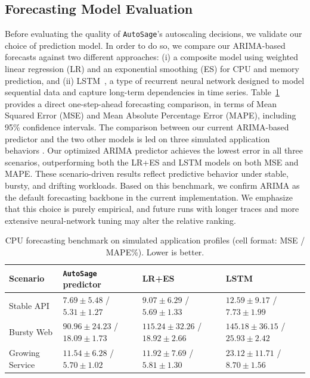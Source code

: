 \documentclass[sigconf]{acmart}
\newcommand{\Solution}{\texttt{AutoSage}}
\newcommand{\cz}[1]{{\color{brown}{#1}}}
\begin{document}
\subsection{Forecasting Model Evaluation}
Before evaluating the quality of \Solution{}'s autoscaling decisions, we validate our choice of prediction model.
In order to do so, we compare our ARIMA-based forecasts against two different approaches: (i) a composite model using weighted linear regression (LR) and an exponential smoothing (ES) for CPU and memory prediction, and (ii) LSTM~\cite{hochreiter1997long}, a type of recurrent neural network designed to model sequential data and capture long-term dependencies in time series.
Table~\ref{tab:forecast-autosage-arima-lstm} provides a direct one-step-ahead
forecasting comparison, in terms of Mean Squared Error (MSE) and Mean Absolute Percentage Error (MAPE), including 95\% confidence intervals. The comparison between our current ARIMA-based predictor and the two other models is led on three simulated application behaviors \cz{@PEDRAM: these three application behaviours need to be explicitly described here or somewhere else}. Our optimized ARIMA predictor achieves the lowest error in all three scenarios, outperforming both the LR+ES and LSTM models on both MSE and MAPE. These scenario-driven results reflect predictive behavior under stable, bursty, and drifting workloads.
Based on this benchmark, we confirm ARIMA as the default forecasting backbone in the current implementation. We emphasize that this choice is purely empirical, and future runs with longer traces and more extensive neural-network tuning may alter the relative ranking.

\begin{table}[t]
  \centering
  \caption{CPU forecasting benchmark on simulated application profiles (cell format: MSE / MAPE\%). Lower is better.}
  \label{tab:forecast-autosage-arima-lstm}
  \scriptsize
  \setlength{\tabcolsep}{3pt}
  \renewcommand{\arraystretch}{1.1}
  \begin{tabular}{>{\raggedright\arraybackslash}p{1.4cm}
                  >{\raggedright\arraybackslash}p{2.1cm}
                  >{\raggedright\arraybackslash}p{2.1cm}
                  >{\raggedright\arraybackslash}p{2.1cm}}
    \toprule
    Scenario & \Solution{} predictor & LR+ES & LSTM \\
    \midrule
    Stable API & \(7.69 \pm 5.48\) / \(5.31 \pm 1.27\) & \(9.07 \pm 6.29\) / \(5.69 \pm 1.33\) & \(12.59 \pm 9.17\) / \(7.73 \pm 1.99\) \\
    Bursty Web & \(90.96 \pm 24.23\) / \(18.09 \pm 1.73\) & \(115.24 \pm 32.26\) / \(18.92 \pm 2.66\) & \(145.18 \pm 36.15\) / \(25.93 \pm 2.42\) \\
    Growing Service & \(11.54 \pm 6.28\) / \(5.70 \pm 1.02\) & \(11.92 \pm 7.69\) / \(5.81 \pm 1.30\) & \(23.12 \pm 11.71\) / \(8.70 \pm 1.56\) \\
    \bottomrule
  \end{tabular}
\end{table}
\end{document}
